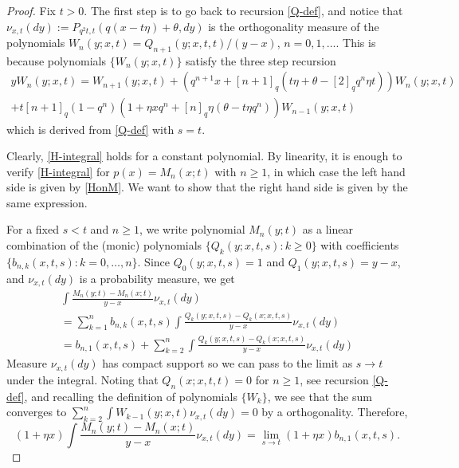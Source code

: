 \documentclass{amsart}
\theoremstyle{definition}
\theoremstyle{remark}
\theoremstyle{remark}
\theoremstyle{definition}
\numberwithin{equation}{section}
\begin{document}
\begin{proof}
 Fix $t>0$.
 The first step is to go back to recursion \eqref{Q-def}, and notice that $\nu_{x,t}(dy):=P_{q^2 t, t}(q(x-t\eta)+\theta,dy)$
 is the orthogonality measure of the polynomials $W_n(y;x,t)=Q_{n+1}(y;x,t,t)/(y-x)$, $n=0,1,\dots$. This is because polynomials $\{W_n(y;x,t)\}$
 satisfy the three step recursion
 \begin{multline}
  y W_n(y;x,t)=W_{n+1}(y;x,t)+ \left(q^{n+1}x+{\left[{n+1}\right]_{q}}(t\eta+\theta-{\left[{2}\right]_{q}}q^n\eta t)\right)W_n(y;x,t)
  \\ + t{\left[{n+1}\right]_{q}}(1-q^n)\left(1+\eta x q^n +{\left[{n}\right]_{q}}\eta(\theta-t\eta q^n)\right)W_{n-1}(y;x,t)
 \end{multline}
which is derived from \eqref{Q-def} with $s=t$.

Clearly, \eqref{H-integral} holds for a constant polynomial.  By linearity, it is enough to verify \eqref{H-integral} for
 $p(x)=M_n(x;t)$ with $n\geq 1$, in which case the left hand side is given by \eqref{HonM}.
We want to show that the right hand side is given by the same expression.

For a fixed  $s<t$ and $n\geq 1$, we write
 polynomial $M_n(y;t)$ as a linear combination of the (monic) polynomials $\{Q_k{(y;x,t,s)}:k\geq 0\}$ with coefficients $\{b_{n,k}(x,t,s):k=0,\dots,n\}$.
 Since $Q_0{(y;x,t,s)}=1$ and  $Q_1{(y;x,t,s)}=y-x$,  and $\nu_{x,t}(dy)$ is a probability measure, we get
\begin{multline*}
  \int \frac{M_n(y;t)-M_n(x;t)}{y-x}\nu_{x,t}(dy)\\=\sum_{k=1}^n b_{n,k}(x,t,s)\int \frac{Q_k{(y;x,t,s)}-Q_k(x;x,t,s)}{y-x}\nu_{x,t}(dy)
  \\=b_{n,1}(x,t,s)+\sum_{k=2}^n \int \frac{Q_k{(y;x,t,s)}-Q_k(x;x,t,s)}{y-x}\nu_{x,t}(dy)
\end{multline*}
Measure $\nu_{x,t}(dy)$ has compact support so we can pass to the limit as $s\to t$ under the integral. Noting that
$Q_n(x;x,t,t)=0$ for $n\geq 1$, see recursion \eqref{Q-def}, and recalling the definition of polynomials $\{W_k\}$,
we see that the   sum  converges to
$\sum_{k=2}^n \int W_{k-1}(y;x,t)\nu_{x,t}(dy)=0$ by a orthogonality.
Therefore,
\begin{equation}
  \label{*}(1+\eta x) \int \frac{M_n(y;t)-M_n(x;t)}{y-x}\nu_{x,t}(dy)=\lim_{s\to t}(1+\eta x) b_{n,1}(x,t,s).
\end{equation}


\end{proof}
\end{document}
